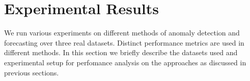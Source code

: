 \section{Experimental Results}
\label{sec:exp}

We run various experiments on different methods of anomaly detection and  forecasting over three real datasets. Distinct performance metrics are used in different methods. 
In this section we briefly describe the datasets used and experimental setup for perfomance analysis on the approaches as discussed in previous sections.




